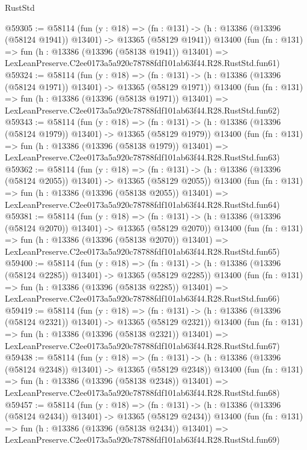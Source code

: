 \begin{lexlean}{RustStd}
\begin{coremodule}
@59305 := @58114
    (fun (y : @18) =>
    (fn : @131) -> (h : @13386 (@13396 (@58124 @1941)) @13401) -> @13365 (@58129 @1941))
    @13400
    (fun (fn : @131) =>
    fun (h : @13386 (@13396 (@58138 @1941)) @13401) =>
    LexLeanPreserve.C2ee0173a5a920c78788fdf101ab63f44.R28.RustStd.fun61)
@59324 := @58114
    (fun (y : @18) =>
    (fn : @131) -> (h : @13386 (@13396 (@58124 @1971)) @13401) -> @13365 (@58129 @1971))
    @13400
    (fun (fn : @131) =>
    fun (h : @13386 (@13396 (@58138 @1971)) @13401) =>
    LexLeanPreserve.C2ee0173a5a920c78788fdf101ab63f44.R28.RustStd.fun62)
@59343 := @58114
    (fun (y : @18) =>
    (fn : @131) -> (h : @13386 (@13396 (@58124 @1979)) @13401) -> @13365 (@58129 @1979))
    @13400
    (fun (fn : @131) =>
    fun (h : @13386 (@13396 (@58138 @1979)) @13401) =>
    LexLeanPreserve.C2ee0173a5a920c78788fdf101ab63f44.R28.RustStd.fun63)
@59362 := @58114
    (fun (y : @18) =>
    (fn : @131) -> (h : @13386 (@13396 (@58124 @2055)) @13401) -> @13365 (@58129 @2055))
    @13400
    (fun (fn : @131) =>
    fun (h : @13386 (@13396 (@58138 @2055)) @13401) =>
    LexLeanPreserve.C2ee0173a5a920c78788fdf101ab63f44.R28.RustStd.fun64)
@59381 := @58114
    (fun (y : @18) =>
    (fn : @131) -> (h : @13386 (@13396 (@58124 @2070)) @13401) -> @13365 (@58129 @2070))
    @13400
    (fun (fn : @131) =>
    fun (h : @13386 (@13396 (@58138 @2070)) @13401) =>
    LexLeanPreserve.C2ee0173a5a920c78788fdf101ab63f44.R28.RustStd.fun65)
@59400 := @58114
    (fun (y : @18) =>
    (fn : @131) -> (h : @13386 (@13396 (@58124 @2285)) @13401) -> @13365 (@58129 @2285))
    @13400
    (fun (fn : @131) =>
    fun (h : @13386 (@13396 (@58138 @2285)) @13401) =>
    LexLeanPreserve.C2ee0173a5a920c78788fdf101ab63f44.R28.RustStd.fun66)
@59419 := @58114
    (fun (y : @18) =>
    (fn : @131) -> (h : @13386 (@13396 (@58124 @2321)) @13401) -> @13365 (@58129 @2321))
    @13400
    (fun (fn : @131) =>
    fun (h : @13386 (@13396 (@58138 @2321)) @13401) =>
    LexLeanPreserve.C2ee0173a5a920c78788fdf101ab63f44.R28.RustStd.fun67)
@59438 := @58114
    (fun (y : @18) =>
    (fn : @131) -> (h : @13386 (@13396 (@58124 @2348)) @13401) -> @13365 (@58129 @2348))
    @13400
    (fun (fn : @131) =>
    fun (h : @13386 (@13396 (@58138 @2348)) @13401) =>
    LexLeanPreserve.C2ee0173a5a920c78788fdf101ab63f44.R28.RustStd.fun68)
@59457 := @58114
    (fun (y : @18) =>
    (fn : @131) -> (h : @13386 (@13396 (@58124 @2434)) @13401) -> @13365 (@58129 @2434))
    @13400
    (fun (fn : @131) =>
    fun (h : @13386 (@13396 (@58138 @2434)) @13401) =>
    LexLeanPreserve.C2ee0173a5a920c78788fdf101ab63f44.R28.RustStd.fun69)

\end{coremodule}
\end{lexlean}
